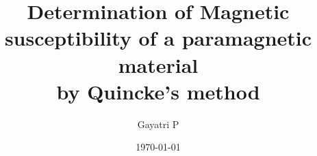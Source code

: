 \documentclass[reprint,amsmath,amssymb,aps]{revtex4-2}
\begin{document}
    \title{Determination of Magnetic susceptibility of a paramagnetic material\\by Quincke’s method}

    \author{Gayatri P}
    \date{\today}

    
    \maketitle

    
    
    
    
    
    
     
    
    \nocite{*}
\end{document}

